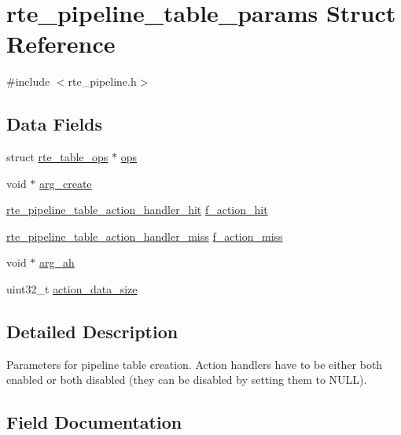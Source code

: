 \hypertarget{structrte__pipeline__table__params}{}\section{rte\+\_\+pipeline\+\_\+table\+\_\+params Struct Reference}
\label{structrte__pipeline__table__params}


{\ttfamily \#include $<$rte\+\_\+pipeline.\+h$>$}

\subsection*{Data Fields}
\begin{DoxyCompactItemize}
\item 
struct \hyperlink{structrte__table__ops}{rte\+\_\+table\+\_\+ops} $\ast$ \hyperlink{structrte__pipeline__table__params_ad1966fbeee5c7e1923a4e567b5bcd77d}{ops}
\item 
void $\ast$ \hyperlink{structrte__pipeline__table__params_ab34a217f23d1f5a27ae00e3fbbba445c}{arg\+\_\+create}
\item 
\hyperlink{rte__pipeline_8h_a9289c02fd9164dc323fc1a614cd7ef3d}{rte\+\_\+pipeline\+\_\+table\+\_\+action\+\_\+handler\+\_\+hit} \hyperlink{structrte__pipeline__table__params_ab2a1d1ad3795cb39f148a392343dce07}{f\+\_\+action\+\_\+hit}
\item 
\hyperlink{rte__pipeline_8h_a19b2c0ec82ebd96c52e15d9c3ca6cdff}{rte\+\_\+pipeline\+\_\+table\+\_\+action\+\_\+handler\+\_\+miss} \hyperlink{structrte__pipeline__table__params_aaa5e9294a7d2b1c271683726263fcb46}{f\+\_\+action\+\_\+miss}
\item 
void $\ast$ \hyperlink{structrte__pipeline__table__params_adfcedab79c75f0129bd5382cf3d48b13}{arg\+\_\+ah}
\item 
uint32\+\_\+t \hyperlink{structrte__pipeline__table__params_a2e23c737ba77e1f57ba715520171f00a}{action\+\_\+data\+\_\+size}
\end{DoxyCompactItemize}


\subsection{Detailed Description}
Parameters for pipeline table creation. Action handlers have to be either both enabled or both disabled (they can be disabled by setting them to N\+U\+L\+L). 

\subsection{Field Documentation}
\hypertarget{structrte__pipeline__table__params_a2e23c737ba77e1f57ba715520171f00a}{}
